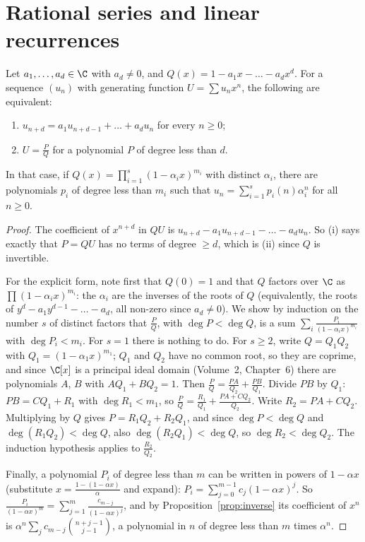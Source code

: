 \section{Rational series and linear recurrences}

\begin{theorem}\label{thm:rational}
Let $a_1,\dots,a_d\in\C$ with $a_d\ne0$, and $Q(x)=1-a_1x-\dots-a_dx^d$. For a sequence $(u_n)$ with generating
function $U=\sum u_nx^n$, the following are equivalent:
\begin{enumerate}[label=(\roman*)]
\item $u_{n+d}=a_1u_{n+d-1}+\dots+a_du_n$ for every $n\ge0$;
\item $U=\frac PQ$ for a polynomial $P$ of degree less than $d$.
\end{enumerate}
In that case, if $Q(x)=\prod_{i=1}^s(1-\alpha_ix)^{m_i}$ with distinct $\alpha_i$, there are polynomials $p_i$ of degree less
than $m_i$ such that $u_n=\sum_{i=1}^sp_i(n)\alpha_i^n$ for all $n\ge0$.
\end{theorem}
\begin{proof}
The coefficient of $x^{n+d}$ in $QU$ is $u_{n+d}-a_1u_{n+d-1}-\dots-a_du_n$. So (i) says exactly that $P=QU$ has no
terms of degree $\ge d$, which is (ii) since $Q$ is invertible.

For the explicit form, note first that $Q(0)=1$ and that $Q$ factors over $\C$ as $\prod(1-\alpha_ix)^{m_i}$: the $\alpha_i$
are the inverses of the roots of $Q$ (equivalently, the roots of $y^d-a_1y^{d-1}-\dots-a_d$, all non-zero since $a_d\ne0$).
We show by induction on the number $s$ of distinct factors that $\frac PQ$, with $\deg P<\deg Q$, is a sum
$\sum_i\frac{P_i}{(1-\alpha_ix)^{m_i}}$ with $\deg P_i<m_i$. For $s=1$ there is nothing to do. For $s\ge2$, write $Q=Q_1Q_2$
with $Q_1=(1-\alpha_1x)^{m_1}$; $Q_1$ and $Q_2$ have no common root, so they are coprime, and since $\C[x]$ is a principal
ideal domain (Volume~2, Chapter~6) there are polynomials $A$, $B$ with $AQ_1+BQ_2=1$. Then
$\frac PQ=\frac{PA}{Q_2}+\frac{PB}{Q_1}$. Divide $PB$ by $Q_1$: $PB=CQ_1+R_1$ with $\deg R_1<m_1$, so
$\frac PQ=\frac{R_1}{Q_1}+\frac{PA+CQ_2}{Q_2}$. Write $R_2=PA+CQ_2$. Multiplying by $Q$ gives $P=R_1Q_2+R_2Q_1$, and since
$\deg P<\deg Q$ and $\deg(R_1Q_2)<\deg Q$, also $\deg(R_2Q_1)<\deg Q$, so $\deg R_2<\deg Q_2$. The induction hypothesis
applies to $\frac{R_2}{Q_2}$.

Finally, a polynomial $P_i$ of degree less than $m$ can be written in powers of $1-\alpha x$ (substitute
$x=\frac{1-(1-\alpha x)}\alpha$ and expand): $P_i=\sum_{j=0}^{m-1}c_j(1-\alpha x)^j$. So
$\frac{P_i}{(1-\alpha x)^m}=\sum_{j=1}^m\frac{c_{m-j}}{(1-\alpha x)^j}$, and by Proposition~\ref{prop:inverse} its coefficient
of $x^n$ is $\alpha^n\sum_jc_{m-j}\binom{n+j-1}{j-1}$, a polynomial in $n$ of degree less than $m$ times $\alpha^n$.
\end{proof}

